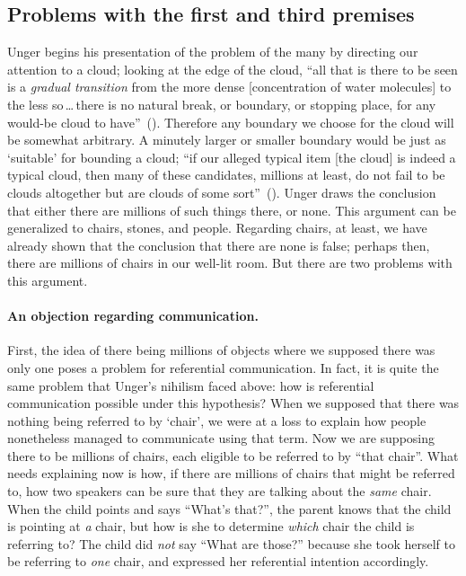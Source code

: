 \documentclass[11pt]{article}
\begin{document}
\begin{spacing}{1.5}
\subsection{Problems with the first and third premises}
\label{many13p}
Unger begins his presentation of the problem of the many by directing our attention to a cloud; looking at the edge of the cloud, ``all that is there to be seen is a {\em gradual transition} from the more dense [concentration of water molecules] to the less so\,\ldots\,there is no natural break, or boundary, or stopping place, for any would-be cloud to have''~(\citeyear[415]{unger1980a}).  Therefore any boundary we choose for the cloud will be somewhat arbitrary.  A minutely larger or smaller boundary would be just as `suitable' for bounding a cloud; ``if our alleged typical item [the cloud] is indeed a typical cloud, then many of these candidates, millions at least, do not fail to be clouds altogether but are clouds of some sort''~(\citeyear[421]{unger1980a}).  Unger draws the conclusion that either there are millions of such things there, or none.  This argument can be generalized to chairs, stones, and people.  Regarding chairs, at least, we have already shown that the conclusion that there are none is false; perhaps then, there are millions of chairs in our well-lit room.  But there are two problems with this argument.

\paragraph{An objection regarding communication.}
First, the idea of there being millions of objects where we supposed there was only one poses a problem for referential communication.  In fact, it is quite the same problem that Unger's nihilism faced above: how is referential communication possible under this hypothesis? When we supposed that there was nothing being referred to by `chair', we were at a loss to explain how people nonetheless managed to communicate using that term.  Now we are supposing there to be millions of chairs, each eligible to be referred to by ``that chair''.  What needs explaining now is how, if there are millions of chairs that might be referred to, how two speakers can be sure that they are talking about the {\em same} chair.  When the child points and says ``What's that?'', the parent knows that the child is pointing at {\em a} chair, but how is she to determine {\em which} chair the child is referring to? The child did {\em not} say ``What are those?'' because she took herself to be referring to {\em one} chair, and expressed her referential intention accordingly.


\end{spacing}
\end{document}
